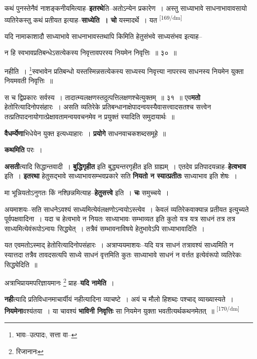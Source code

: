 \documentclass[article,12pt,a4paper]{memoir}
\begin{document}
	  \pstart कथं पुनस्तेनैवं नाशङ्कनीयमित्याह--\textbf{इतरथे}ति--अतोऽन्येन प्रकारेण । अस्तु साध्याभावे साधनाभावावसायो व्यतिरेकस्तु कथं प्रतीयत इत्याह--\textbf{साध्येति । चो} यस्मादर्थे । यत  \leavevmode\textsuperscript{\rmlatinfont\tiny [169/dm]} 
	  
	यदि नामाकाशादौ साध्याभावे साधनाभावस्तथापि किमिति हेतुसंभवे साध्यसंभव इत्याह-- 
	  
	न हि स्वभावप्रतिबन्धेऽसत्येकस्य निवृत्तावपरस्य नियमेन निवृत्तिः ॥ ३० ॥ 
	  
	नहीति । \footnote{भावः--उत्पादः, सत्ता वा--\cite{dp-msD-n}}स्वभावेन प्रतिबन्धो यस्तस्मिन्नसत्येकस्य साध्यस्य निवृत्त्या नापरस्य साधनस्य नियमेन युक्ता नियमवती निवृत्तिः ॥ 
	  
	स च द्विप्रकारः सर्वस्य । तादात्म्यलक्षणस्तदुत्पत्तिलक्षणश्चेत्युक्तम् ॥ ३१ ॥ एव\textbf{मतो} हेतोरित्यादिनोपसंहारः । असति व्यतिरेके प्रतिबन्धानाक्षेपादन्वयस्यैवासत्त्वादसतश्च सत्त्वेन तत्प्रतिपादनायोगात्प्रेक्षावतामन्वयवचनमेव न प्रयुक्तं स्यादिति समुदायार्थः ॥
	\pend
      

	  \pstart \textbf{वैधर्म्येणा}भिधेयेन युक्त इत्यध्याहारः । \textbf{प्रयोगे} साधनवाचकशब्दसमूहे ॥
	\pend
      

	  \pstart \textbf{कथमिति} परः ।
	\pend
      

	  \pstart \textbf{असती}त्यादि सिद्धान्तवादी । \textbf{बुद्धिगृहीत} इति बुद्ध्यन्तरगृहीत इति ग्राह्यम् । एतदेव प्रतिपादयन्नाह--\textbf{हेत्वभाव} इति । \textbf{इतरथा} हेतुसद्भावे साध्याभावसम्भवप्रकारे सति \textbf{नियतो न स्यात्प्रतीतः} साध्याभाव इति शेषः ।
	\pend
      

	  \pstart मा भून्नियतोऽनुगतः किं नश्छिन्नमित्याह--\textbf{हेतुसत्त्वे} इति । \textbf{चः} समुच्चये ।
	\pend
      

	  \pstart अयमाशयः--सति साधनेऽवश्यं साध्यमित्येवंलक्षणोऽन्वयोऽस्त्येव । केवलं व्यतिरेकवाक्यान्न प्रतीयत इत्युच्यते पूर्वपक्षवादिना । यदा च हेत्वभावे न नियतः साध्याभावः सम्भाव्यत इति कुतो यत्र यत्र साधनं तत्र तत्र साध्यमित्येवंरूपोऽन्वयः सिद्ध्येत् । तत्रैवं सम्भावनाविषये हेतुभावेऽपि साध्याभावादिति ।
	\pend
      

	  \pstart यत एवमतोऽस्माद् हेतोरित्यादिनोपसंहारः । अत्राप्ययमाशयः--यदि यत्र साधनं तत्रावश्यं साध्यमिति न स्यात्तदा तत्रैव तावदसत्यपि साध्ये साधनं वृत्तमिति कुतः साध्याभावे साधनं न वर्त्तत इत्येवंरूपो व्यतिरेकः सिद्ध्येदिति ॥
	\pend
      

	  \pstart अत्राभिप्रायमपरिज्ञायमानः \footnote{रिजानानः} प्राह--\textbf{यदि नामेति} ।
	\pend
      

	  \pstart \textbf{नही}त्यादि प्रतिविधानमाचार्यीयं नहीत्यादिना व्याचष्टे । अयं च मौलो हिशब्दः पश्चाद् व्याख्यास्यते । \textbf{नियमेना}वश्यंतया । या चावश्यं \textbf{भाविनी निवृत्तिः} सा नियमेन युक्ता भवतीत्यर्थकथनमेतत् ॥
	\pend
      \leavevmode\textsuperscript{\rmlatinfont\tiny [170/dm]}
\end{document}
